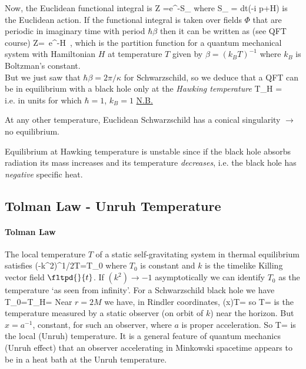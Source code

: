Now, the Euclidean functional integral is
\be
Z =\int \left[\mcD\Phi\right]e^{-S_{}\left[\Phi\right]}
\ee
where 
\be
S_{} = \int dt\left(-i p+H\right)
\ee
is the Euclidean action. If the functional integral is taken over fields $\Phi$
that are periodic in imaginary time with period $\hbar \beta$ then it can be
written as (see QFT course)
\be
Z=\tr\, e^{-\beta H}\, ,
\ee
which is the partition function for a quantum mechanical system with 
Hamiltonian $H$ at temperature $T$ given by $\beta=(k_B T)^{-1}$ where $k_B$ is
Boltzman's constant. \\

But we just saw that $\hbar\beta=2\pi/\kappa$ for Schwarzschild, so we deduce
that a QFT  can be in equilibrium with a black hole only at the \emph{Hawking
temperature}
\be
T_H   =   \frac{\kappa}{2\pi} \\
\ee
i.e. in units for which $\hbar=1$, $k_B=1$
\ul{N.B.}
\begin{list}{()}
{}
\item At any other temperature, Euclidean Schwarzschild has a conical 
singularity $\rightarrow$ no equilibrium.

\item Equilibrium at Hawking temperature is unstable since if the black 
hole absorbs radiation its mass increases and its temperature \emph{decreases},
i.e. the black hole has \emph{negative} specific heat.

\end{list}

\subsection{Tolman Law - Unruh Temperature}

\paragraph{Tolman Law}  The local temperature $T$ of a static 
self-gravitating system in thermal equilibrium satisfies 
\be
\left(-k^2\right)^{1/2}T=T_0
\ee
where $T_0$ is constant and $k$ is the timelike Killing vector 
field $\fltpd{}{t}$.  If $\left(k^2\right)\to -1$ asymptotically we can identify
$T_0$ as the temperature `as seen from infinity'.  For a Schwarzschild black
hole we have
\be
T_0=T_H=\frac{\kappa}{2\pi}
\ee
Near $r=2M$ we have, in Rindler coordinates,
\be
(\kappa x)T=\frac{\kappa}{2\pi}
\ee
so
\be
T=
\ee
is the temperature measured by a static observer (on orbit of $k$) near the 
horizon.  But $x=a^{-1}$, constant, for such an observer, where $a$ is proper
acceleration.  So
\be
T=
\ee
is the local (Unruh) temperature.  It is a general feature of quantum mechanics
(Unruh effect) that an observer accelerating in Minkowski
spacetime appears to be in a heat bath at the Unruh temperature. \\

